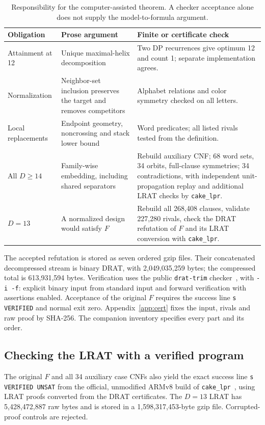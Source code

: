 \documentclass[11pt,a4paper]{article}
\theoremstyle{definition}
\begin{document}
\begin{table}[ht]
\centering\small
\begin{tabularx}{\linewidth}{@{}>{\raggedright\arraybackslash}p{28mm}YY@{}}
\toprule
Obligation & Prose argument & Finite or certificate check\\
\midrule
Attainment at 12 & Unique maximal-helix decomposition & Two DP
recurrences give optimum 12 and count 1; separate implementation agrees.\\
Normalization & Neighbor-set inclusion preserves the target and removes
competitors & Alphabet relations and color symmetry checked on all letters.\\
Local replacements & Endpoint geometry, noncrossing and stack lower
bound & Word predicates; all listed rivals tested from the definition.\\
All $D\geq14$ & Family-wise embedding, including shared separators &
Rebuild auxiliary CNF; 68 word sets, 34 orbits, full-clause symmetries;
34 contradictions, with independent unit-propagation replay and
additional LRAT checks by \texttt{cake\_lpr}.\\
$D=13$ & A normalized design would satisfy $F$ & Rebuild all 268,408
clauses, validate 227,280 rivals, check the DRAT refutation of $F$
and its LRAT conversion with \texttt{cake\_lpr}.\\
\bottomrule
\end{tabularx}
\caption{Responsibility for the computer-assisted theorem. A checker
acceptance alone does not supply the model-to-formula argument.}
\label{tab:obligations}
\end{table}

The accepted refutation is stored as seven ordered gzip files. Their
concatenated decompressed stream is binary DRAT, with
2,049,035,259 bytes; the compressed total is 613,931,594 bytes.
Verification uses the public \texttt{drat-trim} checker~\cite{DRAT},
with \texttt{-i -f}: explicit binary input from standard input and
forward verification with assertions enabled. Acceptance of the original
$F$ requires the success line \texttt{s VERIFIED} and normal exit zero. Appendix~\ref{app:cert} fixes the input, rivals and raw proof by
SHA-256. The companion inventory specifies every part and its order.

\subsection{Checking the LRAT with a verified program}
The original $F$ and all 34 auxiliary case CNFs also yield the exact
success line \texttt{s VERIFIED UNSAT} from the official, unmodified
ARMv8 build of \texttt{cake\_lpr}~\cite{CAKE}, using LRAT proofs converted
from the DRAT certificates. The $D=13$ LRAT has 5,428,472,887 raw bytes
and is stored in a 1,598,317,453-byte gzip file.
Corrupted-proof controls are rejected.
\end{document}
